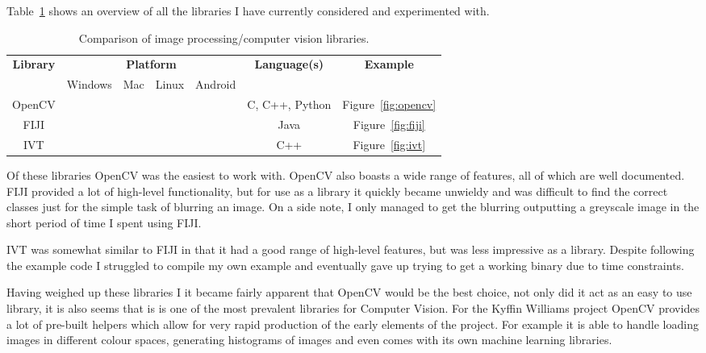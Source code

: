 \documentclass[11pt,fleqn,twoside]{article}
\begin{document}
Table~\ref{tab:libraries-overview} shows an overview of all the libraries I have currently 
considered and experimented with.

\begin{table}[h]
\begin{tabular}{| c | c | c | c | c | c | c |}
								  \hline
\multirow{2}{*}{\textbf{Library}}	& \multicolumn{4}{|c|}{\textbf{Platform}}			& \multirow{2}{*}{\textbf{Language(s)}}	& \textbf{Example}	\\\cline{2-5}
					&  Windows	& Mac 		& Linux 	& Android	&					&			\\\hline
OpenCV					& \checkmark	& \checkmark	& \checkmark	& \checkmark	& C, C++, Python			& Figure~\ref{fig:opencv}\\\hline
FIJI					& \checkmark	& \checkmark	& \checkmark	& 		& Java					& Figure~\ref{fig:fiji}	\\\hline
IVT					& \checkmark	& \checkmark	& \checkmark	& 		& C++					& Figure~\ref{fig:ivt}	\\\hline
\end{tabular}
\caption{Comparison of image processing/computer vision libraries.}
\label{tab:libraries-overview}
\end{table}

Of these libraries OpenCV was the easiest to work with. OpenCV also boasts a wide range of 
features, all of which are well documented. FIJI provided a lot of high-level functionality, but
for use as a library it quickly became unwieldy and was difficult to find the correct classes just 
for the simple task of blurring an image. On a side note, I only managed to get the blurring 
outputting a greyscale image in the short period of time I spent using FIJI.

IVT was somewhat similar to FIJI in that it had a good range of high-level features, but was less
impressive as a library. Despite following the example code I struggled to compile my own example
and eventually gave up trying to get a working binary due to time constraints.


Having weighed up these libraries I it became fairly apparent that OpenCV would be the best choice,
not only did it act as an easy to use library, it is also seems that is is one of the most 
prevalent libraries for Computer Vision. For the Kyffin Williams project OpenCV provides a lot of
pre-built helpers which allow for very rapid production of the early elements of the project. For
example it is able to handle loading images in different colour spaces, generating histograms of
images and even comes with its own machine learning libraries.
\end{document}
